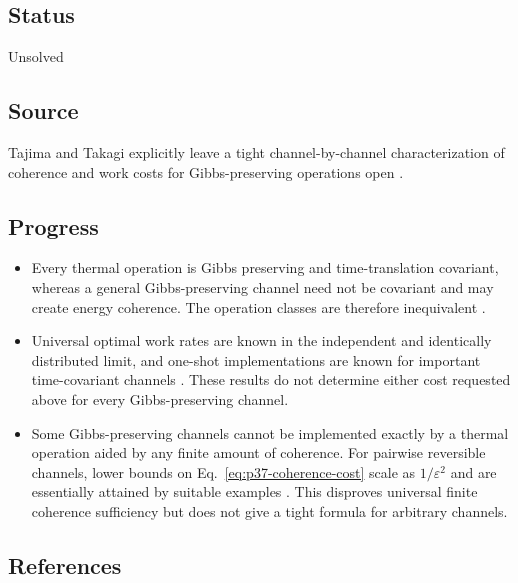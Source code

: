 \subsection*{Status}

Unsolved

\subsection*{Source}

Tajima and Takagi explicitly leave a tight channel-by-channel
characterization of coherence and work costs for Gibbs-preserving operations
open .

\subsection*{Progress}

\begin{itemize}
  \item Every thermal operation is Gibbs preserving and time-translation
  covariant, whereas a general Gibbs-preserving channel need not be covariant
  and may create energy coherence.  The operation classes are therefore
  inequivalent .

  \item Universal optimal work rates are known in the independent and
  identically distributed limit, and one-shot implementations are known for
  important time-covariant channels
  .  These results do not determine
  either cost requested above for every Gibbs-preserving channel.

  \item Some Gibbs-preserving channels cannot be implemented exactly by a
  thermal operation aided by any finite amount of coherence.  For pairwise
  reversible channels, lower bounds on
  Eq.~\eqref{eq:p37-coherence-cost} scale as $1/\varepsilon^2$ and are
  essentially attained by suitable examples
  .  This disproves universal finite
  coherence sufficiency but does not give a tight formula for arbitrary
  channels.
\end{itemize}

\subsection*{References}

